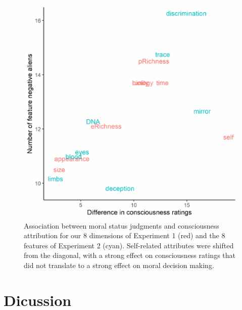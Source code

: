 \documentclass[10pt, letterpaper]{article}
\newenvironment{CodeChunk}{}{}
\begin{document}
\begin{CodeChunk}
\begin{figure}[H]

{\centering \includegraphics{figs/relation_scatter-1} 

}

\caption[Association between moral status judgments and consciousness attribution for our 8 dimensions of Experiment 1 (red) and the 8 features of Experiment 2 (cyan)]{Association between moral status judgments and consciousness attribution for our 8 dimensions of Experiment 1 (red) and the 8 features of Experiment 2 (cyan). Self-related attributes were shifted from the diagonal, with a strong effect on consciousness ratings that did not translate to a strong effect on moral decision making.}\label{fig:relation_scatter}
\end{figure}
\end{CodeChunk}

\hypertarget{dicussion}{%
\section{Dicussion}\label{dicussion}}
\end{document}
